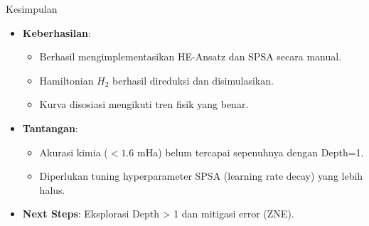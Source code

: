 \documentclass{beamer}
\begin{document}
\begin{frame}{Kesimpulan}
    \begin{itemize}
        \item \textbf{Keberhasilan}:
            \begin{itemize}
                \item Berhasil mengimplementasikan HE-Ansatz dan SPSA secara manual.
                \item Hamiltonian $H_2$ berhasil direduksi dan disimulasikan.
                \item Kurva disosiasi mengikuti tren fisik yang benar.
            \end{itemize}
        \item \textbf{Tantangan}:
            \begin{itemize}
                \item Akurasi kimia ($< 1.6$ mHa) belum tercapai sepenuhnya dengan Depth=1.
                \item Diperlukan tuning hyperparameter SPSA (learning rate decay) yang lebih halus.
            \end{itemize}
        \item \textbf{Next Steps}: Eksplorasi Depth > 1 dan mitigasi error (ZNE).
    \end{itemize}
\end{frame}
\end{document}
